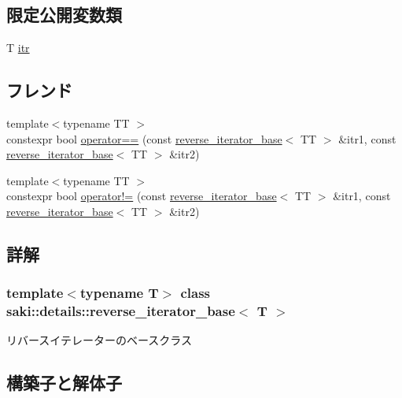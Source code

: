 \subsection*{限定公開変数類}
\begin{DoxyCompactItemize}
\item 
T \mbox{\hyperlink{classsaki_1_1details_1_1reverse__iterator__base_a02df09641bd727c19566dca6c219f279}{itr}}
\end{DoxyCompactItemize}
\subsection*{フレンド}
\begin{DoxyCompactItemize}
\item 
{\footnotesize template$<$typename TT $>$ }\\constexpr bool \mbox{\hyperlink{classsaki_1_1details_1_1reverse__iterator__base_ad8dd5df90aef93e3b60ea87f584a6acf}{operator==}} (const \mbox{\hyperlink{classsaki_1_1details_1_1reverse__iterator__base}{reverse\+\_\+iterator\+\_\+base}}$<$ TT $>$ \&itr1, const \mbox{\hyperlink{classsaki_1_1details_1_1reverse__iterator__base}{reverse\+\_\+iterator\+\_\+base}}$<$ TT $>$ \&itr2)
\item 
{\footnotesize template$<$typename TT $>$ }\\constexpr bool \mbox{\hyperlink{classsaki_1_1details_1_1reverse__iterator__base_a4f19034a62d0d61440f64e39642e2cc6}{operator!=}} (const \mbox{\hyperlink{classsaki_1_1details_1_1reverse__iterator__base}{reverse\+\_\+iterator\+\_\+base}}$<$ TT $>$ \&itr1, const \mbox{\hyperlink{classsaki_1_1details_1_1reverse__iterator__base}{reverse\+\_\+iterator\+\_\+base}}$<$ TT $>$ \&itr2)
\end{DoxyCompactItemize}


\subsection{詳解}
\subsubsection*{template$<$typename T$>$\newline
class saki\+::details\+::reverse\+\_\+iterator\+\_\+base$<$ T $>$}

リバースイテレーターのベースクラス 

\subsection{構築子と解体子}
\mbox{\label{classsaki_1_1details_1_1reverse__iterator__base_accf1bbae68adfab1bf6e88927e3bc453}} 
